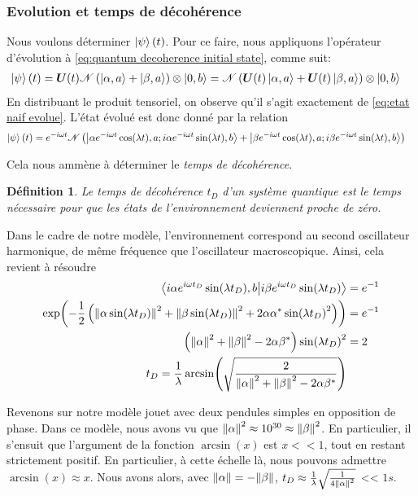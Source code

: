 \documentclass[11pt,oneside,a4paper]{article}
\newtheorem{definition}[theorem]{Définition}
\begin{document}
\subsubsection{Evolution et temps de décohérence}\label{sec:evolution et temps de decoherence}

Nous voulons déterminer $\ket{\psi}(t)$. Pour ce faire, nous appliquons l'opérateur d'évolution à \eqref{eq:quantum decoherence initial state}, comme suit:
\begin{align*}
  \ket{\psi}(t) &= \bm{U}(t)\mathcal{N}\left(\ket{\alpha,a}+\ket{\beta,a}\right)\otimes\ket{0,b} = \mathcal{N}\left(\bm{U}(t)\ket{\alpha,a}+\bm{U}(t)\ket{\beta,a}\right)\otimes\ket{0,b}
\end{align*}
En distribuant le produit tensoriel, on observe qu'il s'agit exactement de \eqref{eq:etat naif evolue}. L'état évolué est donc donné par la relation
\begin{align}
  \ket{\psi}(t) &= e^{-i\omega t}\mathcal{N}\left(\ket{\alpha e^{-i\omega t}\cos(\lambda t),a;i\alpha e^{-i\omega t}\sin(\lambda t),b}+\ket{\beta e^{-i\omega t}\cos(\lambda t),a;i\beta e^{-i\omega t}\sin(\lambda t),b}\right)
\end{align}

Cela nous ammène à déterminer le \emph{temps de décohérence}.
\begin{definition}
  Le temps de décohérence $t_D$ d'un système quantique est le temps nécessaire pour que les états de l'environnement deviennent proche de zéro.\label{def:temps decoherence} 
\end{definition}

Dans le cadre de notre modèle, l'environnement correspond au second oscillateur harmonique, de même fréquence que l'oscillateur macroscopique. Ainsi, cela revient à résoudre
\begin{align}
  \braket{i\alpha e^{i\omega t_D}\sin(\lambda t_D),b}{i\beta e^{i\omega t_D}\sin(\lambda t_D)} &= e^{-1}\notag\\
  \exp(-\frac{1}{2}\left(\norm{\alpha\sin(\lambda t_D)}^2+\norm{\beta\sin(\lambda t_D)}^2+2\alpha\alpha^*\sin(\lambda t_D)^2\right)) &= e^{-1}\notag\\
  \left(\norm{\alpha}^2+\norm{\beta}^2-2\alpha\beta^*\right)\sin(\lambda t_D)^2 &= 2\notag\\
  t_D = \frac{1}{\lambda}\arcsin(\sqrt{\frac{2}{\norm{\alpha}^2+\norm{\beta}^2-2\alpha\beta^*}})&\label{eq:decoherence time general}
\end{align}

Revenons sur notre modèle jouet avec deux pendules simples en opposition de phase. Dans ce modèle, nous avons vu que $\norm{\alpha}^2\approx 10^{30}\approx\norm{\beta}^2$. En particulier, il s'ensuit que l'argument de la fonction $\arcsin(x)$ est $x<<1$, tout en restant strictement positif. En particulier, à cette échelle là, nous pouvons admettre $\arcsin(x)\approx x$. Nous avons alors, avec $\norm{\alpha}=-\norm{\beta}$, $t_D \approx \frac{1}{\lambda}\sqrt{\frac{1}{4\norm{\alpha}^2}}$ << $1s$.
\end{document}
